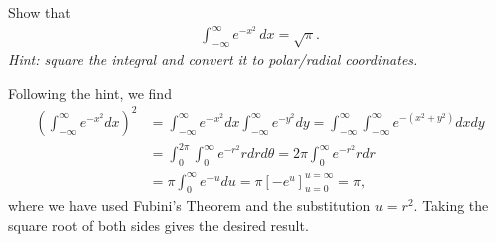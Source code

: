 \documentclass[11pt]{article}
\begin{document}




\begin{exercise}
    Show that 
    \begin{align}
        \int_{-\infty}^{\infty} e^{-x^2} \, dx = \sqrt{\pi}. 
    \end{align}
    \textit{Hint: square the integral and convert it to polar/radial coordinates.}
\end{exercise}
\begin{solution}
    Following the hint, we find
    \begin{align}
        \left(\int_{-\infty}^\infty e^{-x^2} dx\right)^2 &= \int_{-\infty}^\infty e^{-x^2} dx \int_{-\infty}^\infty e^{-y^2} dy = \int_{-\infty}^\infty \int_{-\infty}^\infty e^{-(x^2 + y^2)} dx dy\\
        &= \int_0^{2\pi} \int_0^\infty e^{-r^2} r dr d\theta = 2\pi \int_0^\infty e^{-r^2} r dr \\
        &= \pi \int_0^\infty e^{-u} du = \pi [-e^u]_{u=0}^{u=\infty} = \pi,
    \end{align}
    where we have used Fubini's Theorem and the substitution $u = r^2$. Taking the square root of both sides gives the desired result.
\end{solution}
\end{document}

